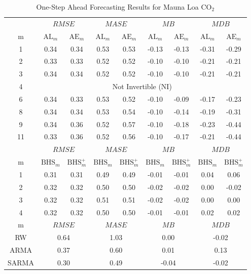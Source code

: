 \begin{table}[htbp]
\footnotesize
\centering
\caption{One-Step Ahead Forecasting Results for Mauna Loa $\textrm{CO}_2$}
\begin{tabular}{c|cc|cc|cc|cc}
  \hline
   & \multicolumn{2}{c|}{$RMSE$} & \multicolumn{2}{c|}{$MASE$} &
  \multicolumn{2}{c|}{$MB$} & \multicolumn{2}{c}{$MDB$}\\
   m & $\textrm{AL}_m$ & $\textrm{AE}_m$ &
  $\textrm{AL}_m$ & $\textrm{AE}_m$ &
  $\textrm{AL}_m$ & $\textrm{AE}_m$ &
  $\textrm{AL}_m$ & $\textrm{AE}_m$ \\
  \hline
  1 & 0.34 & 0.34 & 0.53 & 0.53 & -0.13 & -0.13 & -0.31 & -0.29 \\ 
  2 & 0.33 & 0.33 & 0.52 & 0.52 & -0.10 & -0.10 & -0.21 & -0.21 \\ 
  3 & 0.34 & 0.34 & 0.52 & 0.52 & -0.10 & -0.10 & -0.21 & -0.21 \\ 
  4 & \multicolumn{8}{c}{Not Invertible (NI)} \\ 
  6 & 0.34 & 0.33 & 0.53 & 0.52 & -0.10 & -0.09 & -0.17 & -0.23 \\ 
  8 & 0.34 & 0.34 & 0.53 & 0.54 & -0.10 & -0.14 & -0.19 & -0.31 \\ 
  9 & 0.34 & 0.36 & 0.52 & 0.57 & -0.10 & -0.18 & -0.23 & -0.44 \\ 
  11 & 0.33 & 0.36 & 0.52 & 0.56 & -0.10 & -0.17 & -0.21 & -0.44 \\ 
  \hline
  \hline
     & \multicolumn{2}{c|}{$RMSE$} & \multicolumn{2}{c|}{$MASE$} &
  \multicolumn{2}{c|}{$MB$} & \multicolumn{2}{c}{$MDB$}\\
  m & $\textrm{BHS}_m$ & $\textrm{BHS}^+_m$ &
  $\textrm{BHS}_m$ & $\textrm{BHS}^+_m$ &
  $\textrm{BHS}_m$ & $\textrm{BHS}^+_m$ &
  $\textrm{BHS}_m$ & $\textrm{BHS}^+_m$ \\
  \hline
  1 & 0.31 & 0.31 & 0.49 & 0.49 & -0.01 & -0.01 & 0.04 & 0.06 \\ 
  2 & 0.32 & 0.32 & 0.50 & 0.50 & -0.02 & -0.02 & 0.00 & -0.02 \\ 
  3 & 0.32 & 0.32 & 0.51 & 0.51 & -0.02 & -0.02 & 0.00 & 0.00 \\ 
  4 & 0.32 & 0.32 & 0.50 & 0.50 & -0.01 & -0.01 & 0.02 & 0.02 \\ 
  \hline
  \hline
  m & \multicolumn{2}{c|}{$RMSE$} & \multicolumn{2}{c|}{$MASE$} &
  \multicolumn{2}{c|}{$MB$} & \multicolumn{2}{c}{$MDB$}\\
  \hline
  RW &  \multicolumn{2}{c|}{0.64} & \multicolumn{2}{c|}{1.03} &
  \multicolumn{2}{c|}{0.00} & \multicolumn{2}{c}{-0.02}\\
    ARMA &  \multicolumn{2}{c|}{0.37} & \multicolumn{2}{c|}{0.60} &
  \multicolumn{2}{c|}{0.01} & \multicolumn{2}{c}{0.13}\\
    SARMA &  \multicolumn{2}{c|}{0.30} & \multicolumn{2}{c|}{0.49} &
  \multicolumn{2}{c|}{-0.04} & \multicolumn{2}{c}{-0.02}\\
   \hline
\end{tabular}
\label{tab:maunaloaselect}
\end{table}

